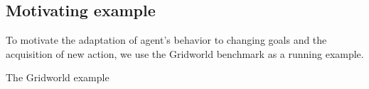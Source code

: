 
\subsection{Motivating example}
\label{sec:motivation}


To motivate the adaptation of agent's behavior to changing goals and the acquisition of new action, 
we use the Gridworld benchmark as a running example.

The Gridworld example 

\endinput